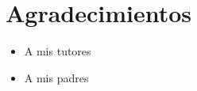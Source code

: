 \chapter*{Agradecimientos}


\begin{itemize}
    \item A mis tutores
    \item A mis padres
\end{itemize}


\clearpage
\newpage
\mbox{}
\clearpage
\newpage
